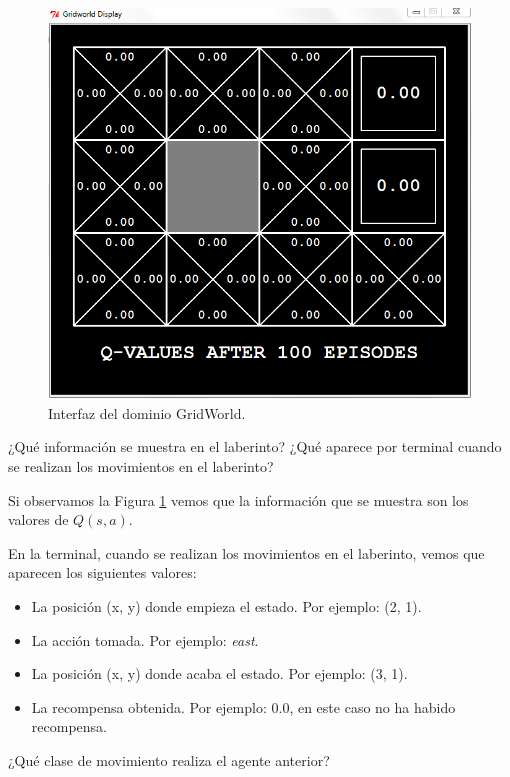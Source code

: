\documentclass[11pt]{exam}
\begin{document}
\begin{questions}
\begin{figure}[h]
	\centering
	\includegraphics[scale=0.5]{image_2}
	\caption{Interfaz del dominio GridWorld.}
	\label{image_2}
\end{figure}

{ \question ¿Qué información se muestra en el laberinto? ¿Qué aparece por terminal cuando se realizan los movimientos en el laberinto? 
}

Si observamos la Figura \ref{image_2} vemos que la información que se muestra son los valores de $Q(s,a)$. 

En la terminal, cuando se realizan los movimientos en el laberinto, vemos que aparecen los siguientes valores:

\begin{itemize}
	\item La posición (x, y) donde empieza el estado. Por ejemplo: (2, 1).
	\item La acción tomada. Por ejemplo: \textit{east}.
	\item La posición (x, y) donde acaba el estado. Por ejemplo: (3, 1).
	\item La recompensa obtenida. Por ejemplo: 0.0, en este caso no ha habido recompensa.
\end{itemize}

{ \question ¿Qué clase de movimiento realiza el agente anterior?}



\end{questions}
\end{document}
